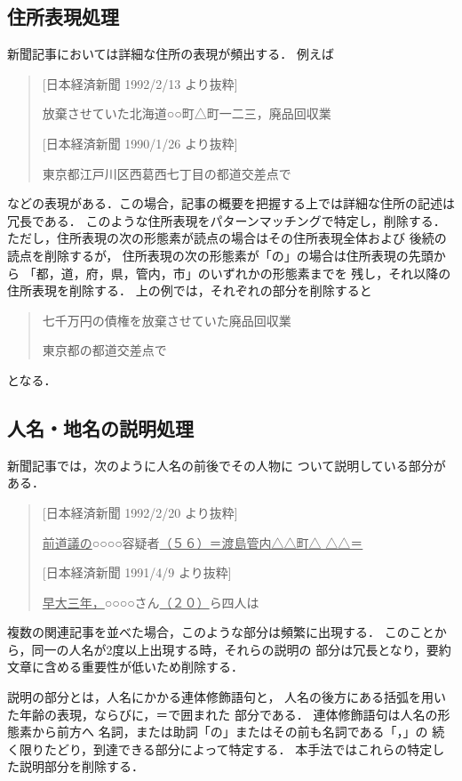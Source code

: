 \subsection{住所表現処理}
新聞記事においては詳細な住所の表現が頻出する．
例えば
\begin{quote}
[日本経済新聞 1992/2/13 より抜粋]

放棄させていた北海道○○町△町一二三，廃品回収業

[日本経済新聞 1990/1/26 より抜粋]

東京都江戸川区西葛西七丁目の都道交差点で
\end{quote}
などの表現がある．この場合，記事の概要を把握する上では詳細な住所の記述は
冗長である．
このような住所表現をパターンマッチングで特定し，削除する．
ただし，住所表現の次の形態素が読点の場合はその住所表現全体および
後続の読点を削除するが，
住所表現の次の形態素が「の」の場合は住所表現の先頭から
「都，道，府，県，管内，市」のいずれかの形態素までを
残し，それ以降の住所表現を削除する．
上の例では，それぞれの部分を削除すると
\begin{quote}
七千万円の債権を放棄させていた廃品回収業

東京都の都道交差点で
\end{quote}
となる．

\subsection{人名・地名の説明処理}
新聞記事では，次のように人名の前後でその人物に
ついて説明している部分がある．
\begin{quote}
[日本経済新聞 1992/2/20 より抜粋]

\underline{前道議の}○○○○容疑者\underline{（５６）＝渡島管内△△町△
 △△＝ }


[日本経済新聞 1991/4/9 より抜粋]

\underline{早大三年，}○○○○さん\underline{（２０）}ら四人は
\end{quote}

複数の関連記事を並べた場合，このような部分は頻繁に出現する．
このことから，同一の人名が2度以上出現する時，それらの説明の
部分は冗長となり，要約文章に含める重要性が低いため削除する．

説明の部分とは，人名にかかる連体修飾語句と，
人名の後方にある括弧を用いた年齢の表現，ならびに，＝で囲まれた
部分である．
連体修飾語句は人名の形態素から前方へ
名詞，または助詞「の」またはその前も名詞である「，」の
続く限りたどり，到達できる部分によって特定する．
本手法ではこれらの特定した説明部分を削除する．


